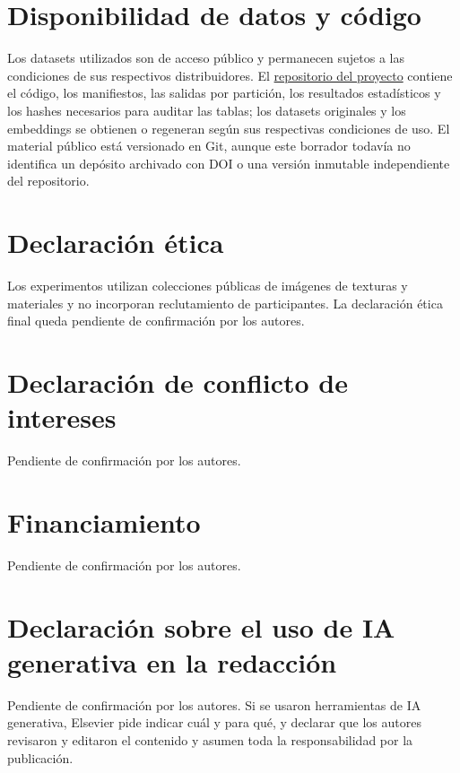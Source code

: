\documentclass[a4paper,fleqn]{cas-sc}
\begin{document}
\section*{Disponibilidad de datos y código}
Los datasets utilizados son de acceso público y permanecen sujetos a las condiciones de sus respectivos distribuidores. El \href{https://github.com/Joafp/concatenacion-descriptores-texturas}{repositorio del proyecto} contiene el código, los manifiestos, las salidas por partición, los resultados estadísticos y los hashes necesarios para auditar las tablas; los datasets originales y los embeddings se obtienen o regeneran según sus respectivas condiciones de uso. El material público está versionado en Git, aunque este borrador todavía no identifica un depósito archivado con DOI o una versión inmutable independiente del repositorio.

\section*{Declaración ética}
Los experimentos utilizan colecciones públicas de imágenes de texturas y materiales y no incorporan reclutamiento de participantes. La declaración ética final queda pendiente de confirmación por los autores.

\section*{Declaración de conflicto de intereses}
Pendiente de confirmación por los autores.

\section*{Financiamiento}
Pendiente de confirmación por los autores.

\section*{Declaración sobre el uso de IA generativa en la redacción}
Pendiente de confirmación por los autores. Si se usaron herramientas de IA generativa, Elsevier pide indicar cuál y para qué, y declarar que los autores revisaron y editaron el contenido y asumen toda la responsabilidad por la publicación.

\printcredits



\end{document}
